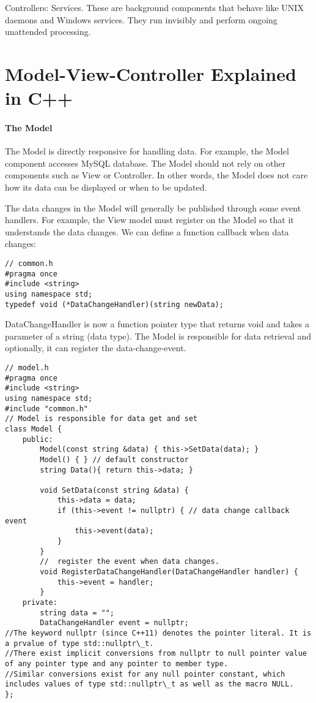 \documentclass{book}
\begin{document}
Controllers: Services.
These are background components that behave like UNIX daemons and Windows services. They run invisibly and perform ongoing unattended processing.

\section{Model-View-Controller Explained in C++}
\paragraph{The Model}

The Model is directly responsive for handling data. For example, the Model component accesses MySQL database.
The Model should not rely on other components such as View or Controller.
In other words, the Model does not care how its data can be displayed or when to be updated.

The data changes in the Model will generally be published through some event handlers.
For example, the View model must register on the Model so that it understands the data changes. We can define a function callback when data changes:
\begin{lstlisting}
// common.h
#pragma once
#include <string>
using namespace std;
typedef void (*DataChangeHandler)(string newData);
\end{lstlisting}
DataChangeHandler is now a function pointer type that returns void and takes a parameter of a string (data type). 
The Model is responsible for data retrieval and optionally, it can register the data-change-event.

\begin{lstlisting}
// model.h
#pragma once
#include <string>
using namespace std;
#include "common.h"
// Model is responsible for data get and set
class Model {
    public:
        Model(const string &data) { this->SetData(data); }
        Model() { } // default constructor
        string Data(){ return this->data; }
 
        void SetData(const string &data) {
            this->data = data;
            if (this->event != nullptr) { // data change callback event
                this->event(data);
            }   
        }
        //  register the event when data changes.
        void RegisterDataChangeHandler(DataChangeHandler handler) {
            this->event = handler;
        }
    private:
        string data = "";
        DataChangeHandler event = nullptr;
//The keyword nullptr (since C++11) denotes the pointer literal. It is a prvalue of type std::nullptr\_t.
//There exist implicit conversions from nullptr to null pointer value of any pointer type and any pointer to member type.
//Similar conversions exist for any null pointer constant, which includes values of type std::nullptr\_t as well as the macro NULL. 
};
\end{lstlisting}
\end{document}
